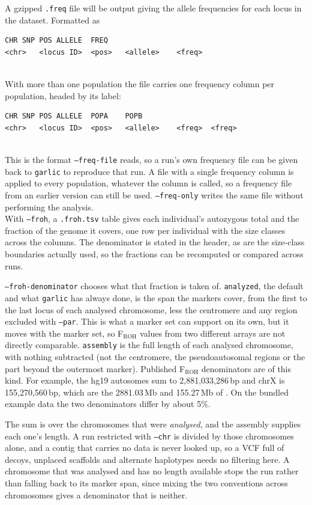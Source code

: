 \documentclass[12pt]{article}%
\begin{document}
A gzipped {\tt .freq} file will be output giving the allele frequencies for each locus in the dataset.  Formatted as
\begin{lstlisting}
CHR	SNP	POS	ALLELE	FREQ
<chr>	<locus ID>	<pos>	<allele>	<freq>
\end{lstlisting}
~\\
With more than one population the file carries one frequency column per population, headed by its label:
\begin{lstlisting}
CHR	SNP	POS	ALLELE	POPA	POPB
<chr>	<locus ID>	<pos>	<allele>	<freq>	<freq>
\end{lstlisting}
~\\
This is the format {\tt --freq-file} reads, so a run's own frequency file can be given back to {\tt garlic} to reproduce that run.  A file with a single frequency column is applied to every population, whatever the column is called, so a frequency file from an earlier version can still be used.  {\tt --freq-only} writes the same file without performing the analysis.
~\\
With {\tt --froh}, a {\tt .froh.tsv} table gives each individual's autozygous
total and the fraction of the genome it covers, one row per individual with the
size classes across the columns.  The denominator is stated in the header, as
are the size-class boundaries actually used, so the fractions can be recomputed
or compared across runs.

{\tt --froh-denominator} chooses what that fraction is taken of.
{\tt analyzed}, the default and what {\tt garlic} has always done, is the span
the markers cover, from the first to the last locus of each analysed
chromosome, less the centromere and any region excluded with {\tt --par}.  This
is what a marker set can support on its own, but it moves with the marker set,
so F$_{\mathrm{ROH}}$ values from two different arrays are not directly
comparable.  {\tt assembly} is the full length of each analysed chromosome,
with nothing subtracted (not the centromere, the pseudoautosomal regions or the
part beyond the outermost marker).  Published F$_{\mathrm{ROH}}$ denominators
are of this kind.  For example, the hg19 autosomes sum to
2,881,033,286\,bp and chrX is 155,270,560\,bp, which are the 2881.03\,Mb and
155.27\,Mb of \citet{CotterEtAl24}.  On the bundled example data the two
denominators differ by about 5\%.

The sum is over the chromosomes that were {\em analysed}, and the assembly
supplies each one's length.  A run restricted with {\tt --chr} is divided by
those chromosomes alone, and a contig that carries no data is never looked up,
so a VCF full of decoys, unplaced scaffolds and alternate haplotypes needs no
filtering here.  A chromosome that was analysed and has no length available
stops the run rather than falling back to its marker span, since mixing the
two conventions across chromosomes gives a denominator that is neither.
\end{document}
